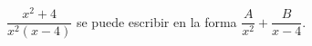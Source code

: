 \item $\dfrac{x^2 + 4}{x^2(x - 4)}$ se puede escribir en la forma $\dfrac{A}{x^2} + \dfrac{B}{x - 4}$.
